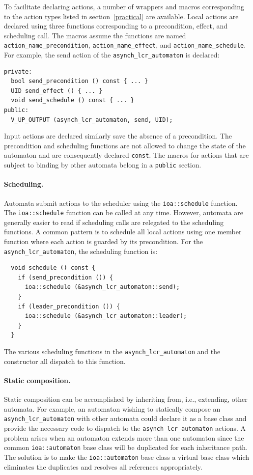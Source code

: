 To facilitate declaring actions, a number of wrappers and macros corresponding to the action types listed in section~\ref{practical} are available.
Local actions are declared using three functions corresponding to a precondition, effect, and scheduling call.
The macros assume the functions are named \verb+action_name_precondition+, \verb+action_name_effect+, and \verb+action_name_schedule+.
For example, the send action of the \verb+asynch_lcr_automaton+ is declared:
\begin{lstlisting}
private:
  bool send_precondition () const { ... }
  UID send_effect () { ... }
  void send_schedule () const { ... }
public:
  V_UP_OUTPUT (asynch_lcr_automaton, send, UID);
\end{lstlisting}
Input actions are declared similarly save the absence of a precondition.
The precondition and scheduling functions are not allowed to change the state of the automaton and are consequently declared \verb+const+.
The macros for actions that are subject to binding by other automata belong in a \verb+public+ section.

\paragraph{Scheduling.}
Automata submit actions to the scheduler using the \verb+ioa::schedule+ function.
The \verb+ioa::schedule+ function can be called at any time.
However, automata are generally easier to read if scheduling calls are relegated to the scheduling functions.
A common pattern is to schedule all local actions using one member function where each action is guarded by its precondition.
For the \verb+asynch_lcr_automaton+, the scheduling function is:
\begin{lstlisting}
  void schedule () const {
    if (send_precondition ()) {
      ioa::schedule (&asynch_lcr_automaton::send);
    }
    if (leader_precondition ()) {
      ioa::schedule (&asynch_lcr_automaton::leader);
    }
  }
\end{lstlisting}
The various scheduling functions in the \verb+asynch_lcr_automaton+ and the constructor all dispatch to this function.

\paragraph{Static composition.}
Static composition can be accomplished by inheriting from, i.e., extending, other automata.
For example, an automaton wishing to statically compose an \verb+asynch_lcr_automaton+ with other automata could declare it as a base class and provide the necessary code to dispatch to the \verb+asynch_lcr_automaton+ actions.
A problem arises when an automaton extends more than one automaton since the common \verb+ioa::automaton+ base class will be duplicated for each inheritance path.
The solution is to make the \verb+ioa::automaton+ base class a virtual base class which eliminates the duplicates and resolves all references appropriately.

